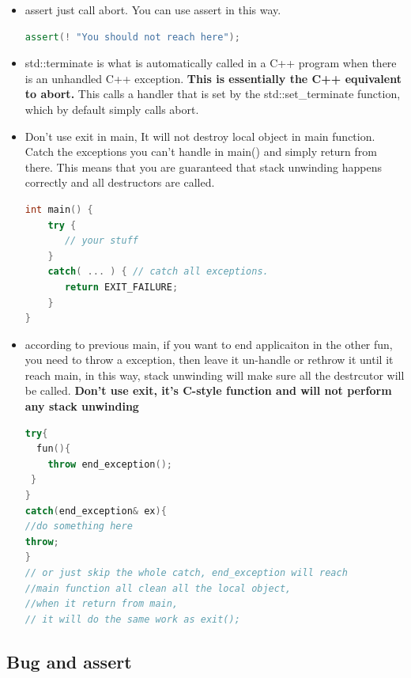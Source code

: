 \documentclass[a4paper,12pt,twoside]{book}
\begin{document}
\begin{itemize}
\item assert just call abort. You can use assert in this way.
\begin{lstlisting}[frame=single, language=c++]
assert(! "You should not reach here");
\end{lstlisting}

\item std::terminate is what is automatically called in a C++ program when there is an unhandled C++ exception. \textbf{This is essentially the C++ equivalent to abort.} This calls a handler that is set by the std::set\_terminate function, which by default simply calls abort.

\item Don't use exit in main, It will not destroy local object in main function. Catch the exceptions you can't handle in main() and simply return from there. This means that you are guaranteed that stack unwinding happens correctly and all destructors are called.
\begin{lstlisting}[frame=single, language=c++]
int main() {
    try {
       // your stuff
    }
    catch( ... ) { // catch all exceptions.
       return EXIT_FAILURE;
    }
}
\end{lstlisting}

\item according to previous main, if you want to end applicaiton in the other fun, you need to throw a exception, then leave it un-handle or rethrow it until it reach main, in this way, stack unwinding will make sure all the destrcutor will be called. \textbf{Don't use exit, it's C-style function and will not perform any stack unwinding}
\begin{lstlisting}[frame=single, language=c++]
try{
  fun(){
    throw end_exception();
 }
}
catch(end_exception& ex){
//do something here
throw;
}
// or just skip the whole catch, end_exception will reach
//main function all clean all the local object,
//when it return from main,
// it will do the same work as exit();
\end{lstlisting}

\end{itemize}


\subsection{Bug and assert}
\end{document}

